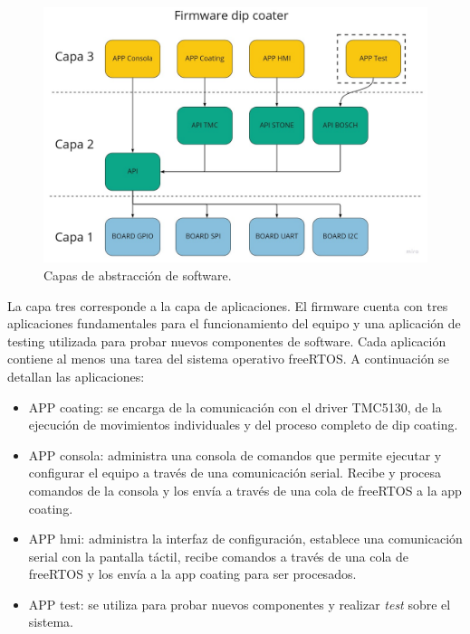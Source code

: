 \begin{figure}[h]
	\centering
	\includegraphics[width=1\textwidth]{./Figures/capas.jpg}
	\caption{Capas de abstracción de software.}
	\label{fig:capas}
\end{figure}


La capa tres corresponde a la capa de aplicaciones. El firmware cuenta con tres aplicaciones fundamentales para el funcionamiento del equipo y una aplicación de testing utilizada para probar nuevos componentes de software. Cada aplicación contiene al menos una tarea del sistema operativo freeRTOS. A continuación se detallan las aplicaciones:

\begin{itemize}

\item APP coating: se encarga de la comunicación con el driver TMC5130, de la ejecución de movimientos individuales y del proceso completo de dip coating.
\item APP consola: administra una consola de comandos que permite ejecutar y configurar el equipo a través de una comunicación serial. Recibe y procesa comandos de la consola y los envía a través de una cola de freeRTOS a la app coating.
\item APP hmi: administra la interfaz de configuración, establece una comunicación serial con la pantalla táctil, recibe comandos a través de una cola de freeRTOS y los envía a la app coating para ser procesados.
\item APP test: se utiliza para probar nuevos componentes y realizar \textit{test} sobre el sistema.

\end{itemize}


